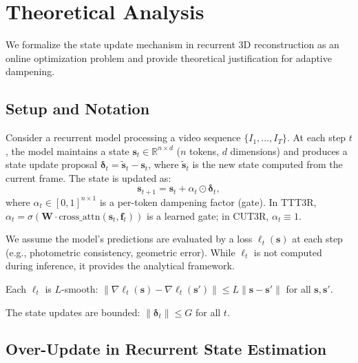 \section{Theoretical Analysis}
\label{sec:theory}

We formalize the state update mechanism in recurrent 3D reconstruction as an online optimization problem and provide theoretical justification for adaptive dampening.

\subsection{Setup and Notation}

Consider a recurrent model processing a video sequence $\{I_1, \ldots, I_T\}$. At each step $t$, the model maintains a state $\mathbf{s}_t \in \mathbb{R}^{n \times d}$ ($n$ tokens, $d$ dimensions) and produces a state update proposal $\boldsymbol{\delta}_t = \tilde{\mathbf{s}}_t - \mathbf{s}_t$, where $\tilde{\mathbf{s}}_t$ is the new state computed from the current frame. The state is updated as:
\begin{equation}
    \mathbf{s}_{t+1} = \mathbf{s}_t + \alpha_t \odot \boldsymbol{\delta}_t,
    \label{eq:state_update}
\end{equation}
where $\alpha_t \in [0, 1]^{n \times 1}$ is a per-token dampening factor (gate). In TTT3R, $\alpha_t = \sigma(\mathbf{W} \cdot \text{cross\_attn}(\mathbf{s}_t, \mathbf{f}_t))$ is a learned gate; in CUT3R, $\alpha_t \equiv 1$.

We assume the model's predictions are evaluated by a loss $\ell_t(\mathbf{s})$ at each step (e.g., photometric consistency, geometric error). While $\ell_t$ is not computed during inference, it provides the analytical framework.

\begin{assumption}[$L$-smoothness]
\label{ass:smooth}
Each $\ell_t$ is $L$-smooth: $\|\nabla \ell_t(\mathbf{s}) - \nabla \ell_t(\mathbf{s}')\| \leq L \|\mathbf{s} - \mathbf{s}'\|$ for all $\mathbf{s}, \mathbf{s}'$.
\end{assumption}

\begin{assumption}
\label{ass:bounded}
The state updates are bounded: $\|\boldsymbol{\delta}_t\| \leq G$ for all $t$.
\end{assumption}

\subsection{Over-Update in Recurrent State Estimation}

